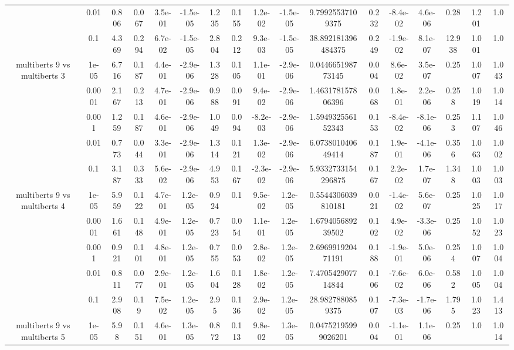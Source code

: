 \begin{tabular}{|c|c|c|c|c|c|c|c|c|c|c|c|c|c|c|c|c|}
 & 0.01 & 0.806 & 0.067 & 3.5e-01 & -1.5e-05 & 1.235 & 0.155 & 1.2e-02 & -1.5e-05 & 9.79925537109375 & 0.232 & -8.4e-02 & 4.6e-06 & 0.28 & 1.201 & 1.0 \\
 & 0.1 & 4.369 & 0.294 & 6.7e-02 & -1.5e-05 & 2.804 & 0.212 & 9.3e-03 & -1.5e-05 & 38.892181396484375 & 0.249 & -1.9e-02 & 8.1e-07 & 12.938 & 1.001 & 1.0 \\
\hline
\multirow{5}{*}{multiberts 9 vs multiberts 3} & 1e-05 & 6.716 & 0.187 & 4.4e-01 & -2.9e-06 & 1.328 & 0.105 & 1.1e-01 & -2.9e-06 & 0.044665198773145 & 0.004 & 8.6e-02 & 3.5e-07 & 0.25 & 1.007 & 1.043 \\
 & 0.0001 & 2.167 & 0.213 & 4.7e-01 & -2.9e-06 & 0.988 & 0.091 & 9.4e-02 & -2.9e-06 & 1.463178157806396 & 0.068 & 1.8e-01 & 2.2e-06 & 0.258 & 1.019 & 1.014 \\
 & 0.001 & 1.259 & 0.187 & 4.6e-01 & -2.9e-06 & 1.049 & 0.094 & -8.2e-03 & -2.9e-06 & 1.594932556152343 & 0.153 & -8.4e-02 & -8.1e-06 & 0.253 & 1.107 & 1.046 \\
 & 0.01 & 0.773 & 0.044 & 3.3e-01 & -2.9e-06 & 1.314 & 0.121 & 1.3e-02 & -2.9e-06 & 6.073801040649414 & 0.187 & 1.9e-01 & -4.1e-06 & 0.356 & 1.063 & 1.002 \\
 & 0.1 & 3.187 & 0.333 & 5.6e-02 & -2.9e-06 & 4.953 & 0.167 & -2.3e-02 & -2.9e-06 & 5.9332733154296875 & 0.167 & 2.2e-02 & 1.7e-07 & 1.348 & 1.003 & 1.003 \\
\hline
\multirow{5}{*}{multiberts 9 vs multiberts 4} & 1e-05 & 5.959 & 0.122 & 4.7e-01 & 1.2e-05 & 0.924 & 0.1 & 9.5e-02 & 1.2e-05 & 0.5544306039810181 & 0.021 & -1.4e-02 & 5.6e-07 & 0.25 & 1.025 & 1.017 \\
 & 0.0001 & 1.661 & 0.148 & 4.9e-01 & 1.2e-05 & 0.723 & 0.054 & 1.1e-01 & 1.2e-05 & 1.679405689239502 & 0.102 & 4.9e-02 & -3.3e-06 & 0.25 & 1.052 & 1.023 \\
 & 0.001 & 0.921 & 0.101 & 4.8e-01 & 1.2e-05 & 0.755 & 0.053 & 2.8e-02 & 1.2e-05 & 2.696991920471191 & 0.188 & -1.9e-01 & 5.0e-06 & 0.254 & 1.007 & 1.004 \\
 & 0.01 & 0.811 & 0.077 & 2.9e-01 & 1.2e-05 & 1.604 & 0.128 & 1.8e-02 & 1.2e-05 & 7.470542907714844 & 0.106 & -7.6e-02 & 6.0e-06 & 0.582 & 1.005 & 1.004 \\
 & 0.1 & 2.908 & 0.19 & 7.5e-02 & 1.2e-05 & 2.95 & 0.136 & 2.9e-02 & 1.2e-05 & 28.9827880859375 & 0.107 & -7.3e-03 & -1.7e-06 & 1.795 & 1.023 & 1.413 \\
\hline
\multirow{5}{*}{multiberts 9 vs multiberts 5} & 1e-05 & 5.98 & 0.151 & 4.6e-01 & 1.3e-05 & 0.872 & 0.113 & 9.8e-02 & 1.3e-05 & 0.04752195999026201 & 0.004 & -1.1e-01 & 1.1e-06 & 0.25 & 1.0 & 1.014 \\

\end{tabular}
